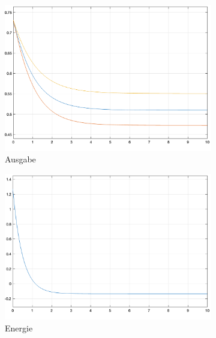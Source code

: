 \begin{figure}[h]
  \centering
  \begin{subfigure}[b]{0.32\textwidth}
    \includegraphics[width=\textwidth]{abbildungen/hnn_simulation_1_ausgabe.png}
    \caption{Ausgabe}
  \end{subfigure}%
  \hfill
  \begin{subfigure}[b]{0.32\textwidth}
    \includegraphics[width=\textwidth]{abbildungen/hnn_simulation_1_energiefunktion.png}
    \caption{Energie}
  \end{subfigure}%
  \hfill
  \begin{subfigure}[b]{0.32\textwidth}

\end{subfigure}
\end{figure}
